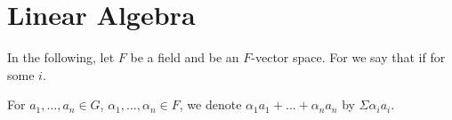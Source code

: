 
\section{Linear Algebra}

In the following, let $F$ be a field and  be
an $F$-vector space.  For
 we say that
 if  for some $i$.

\begin{notation}
For $a_1, \ldots, a_n\in G$, $\alpha_1, \ldots, \alpha_n \in F$, we
denote $\alpha_1 a_1+ \ldots + \alpha_n a_n$ by $\Sigma \alpha_i a_i$.
\end{notation}

